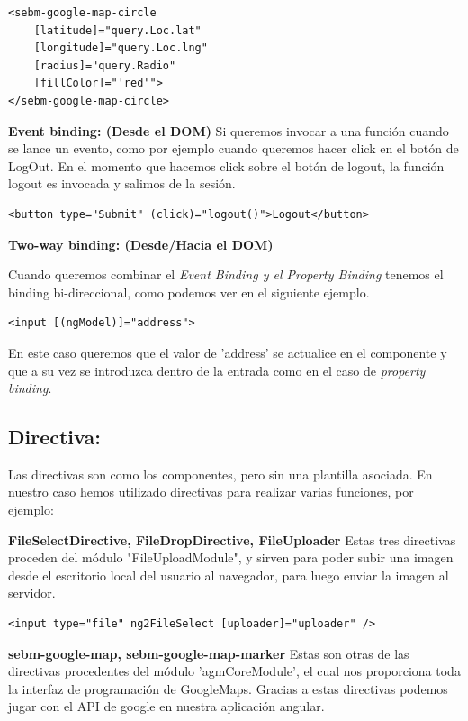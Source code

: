 \begin{lstlisting}
<sebm-google-map-circle
    [latitude]="query.Loc.lat"
    [longitude]="query.Loc.lng"
    [radius]="query.Radio"
    [fillColor]="'red'">
</sebm-google-map-circle>
\end{lstlisting}

\textbf{Event binding: (Desde el DOM)}
Si queremos invocar a una función cuando se lance un evento, como por ejemplo cuando queremos hacer click en el botón de LogOut. En el momento que hacemos click sobre el botón de logout, la función logout es invocada y salimos de la sesión.

\begin{lstlisting}
<button type="Submit" (click)="logout()">Logout</button>
\end{lstlisting}

\textbf{Two-way binding: (Desde/Hacia el DOM)}

Cuando queremos combinar el \textit{Event Binding y el Property Binding} tenemos el binding bi-direccional, como podemos ver en el siguiente ejemplo.

\begin{lstlisting}
<input [(ngModel)]="address">
\end{lstlisting}

En este caso queremos que el valor de 'address' se actualice en el componente y que a su vez se introduzca dentro de la entrada como en el caso de \textit{property binding}.

\subsection{Directiva: }Las directivas son como los componentes, pero sin una plantilla asociada. En nuestro caso hemos utilizado directivas para realizar varias funciones, por ejemplo:

\textbf{FileSelectDirective, FileDropDirective, FileUploader} Estas tres directivas proceden del módulo "FileUploadModule", y sirven para poder subir una imagen desde el escritorio local del usuario al navegador, para luego enviar la imagen al servidor.

\begin{lstlisting}
<input type="file" ng2FileSelect [uploader]="uploader" />
\end{lstlisting}
\textbf{sebm-google-map, sebm-google-map-marker} Estas son otras de las directivas procedentes del módulo 'agmCoreModule', el cual nos proporciona toda la interfaz de programación de GoogleMaps. Gracias a estas directivas podemos jugar con el API de google en nuestra aplicación angular.


